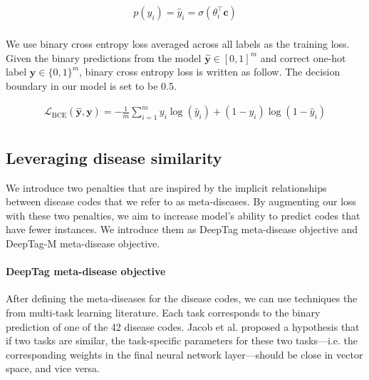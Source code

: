 \documentclass{article}[11pt,oneside]
\begin{document}
\begin{equation}
\begin{aligned}
p(y_i) = \hat{y}_i = \sigma(\theta_i^\intercal \bm{c})\\
\end{aligned}
\label{eq:binary}
\end{equation}

We use binary cross entropy loss averaged across all labels as the training loss. Given the binary predictions from the model $\bm{\hat y} \in [0, 1]^m$ and correct one-hot label $\bm{y} \in \{0, 1\}^m$, binary cross entropy loss is written as follow. The decision boundary in our model is set to be 0.5.

\begin{equation}
\begin{aligned}
\mathcal{L}_{\text{BCE}}(\bm{\hat{y}}, \bm{y}) = - \frac{1}{m} \sum_{i=1}^m y_i \log (\hat y_i) + (1 - y_i)\log(1- \hat y_i) \\
\end{aligned}
\end{equation}

\subsection{Leveraging disease similarity}

We introduce two penalties that are inspired by the implicit relationships between disease codes that we refer to as meta-diseases. By augmenting our loss with these two penalties, we aim to increase model's ability to predict codes that have fewer instances. We introduce them as DeepTag meta-disease objective and DeepTag-M meta-disease objective.

\paragraph{DeepTag meta-disease objective} 

After defining the meta-diseases for the disease codes, we can use techniques the from multi-task learning literature. Each task corresponds to the binary prediction of one of the 42 disease codes. Jacob et al.\cite{jacob2009clustered}
proposed a hypothesis that if two tasks are similar, the task-specific parameters for these two tasks---i.e. the corresponding weights in the final neural network layer---should be close in vector space, and vice versa.
\end{document}
